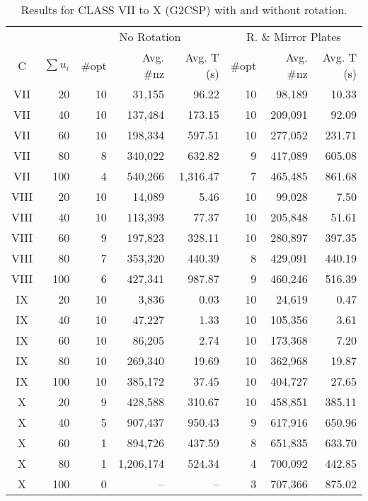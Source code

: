 \begin{table}[!t]
\centering
\caption{Results for CLASS VII to X (G2CSP) with and without rotation.}
\label{tab:g2csp_class_7to10_joined}
\begin{tabular}{crrrrrrr}
\hline\hline
& & \multicolumn{3}{c}{No Rotation} & \multicolumn{3}{c}{R. \& Mirror Plates} \\\cmidrule(lr){3-5}\cmidrule(lr){6-8}
C & \(\sum u_i\) & \#opt & Avg. \#nz & Avg. T (s) & \#opt & Avg. \#nz & Avg. T (s) \\\hline
 VII &  20 & 10 & 31,155 & 96.22 & 10 & 98,189 & 10.33 \\
 VII &  40 & 10 & 137,484 & 173.15 & 10 & 209,091 & 92.09 \\
 VII &  60 & 10 & 198,334 & 597.51 & 10 & 277,052 & 231.71 \\
 VII &  80 & 8 & 340,022 & 632.82 & 9 & 417,089 & 605.08 \\
 VII & 100 & 4 & 540,266 & 1,316.47 & 7 & 465,485 & 861.68 \\
VIII &  20 & 10 & 14,089 & 5.46 & 10 & 99,028 & 7.50 \\
VIII &  40 & 10 & 113,393 & 77.37 & 10 & 205,848 & 51.61 \\
VIII &  60 & 9 & 197,823 & 328.11 & 10 & 280,897 & 397.35 \\
VIII &  80 & 7 & 353,320 & 440.39 & 8 & 429,091 & 440.19 \\
VIII & 100 & 6 & 427,341 & 987.87 & 9 & 460,246 & 516.39 \\
  IX &  20 & 10 & 3,836 & 0.03 & 10 & 24,619 & 0.47 \\
  IX &  40 & 10 & 47,227 & 1.33 & 10 & 105,356 & 3.61 \\
  IX &  60 & 10 & 86,205 & 2.74 & 10 & 173,368 & 7.20 \\
  IX &  80 & 10 & 269,340 & 19.69 & 10 & 362,968 & 19.87 \\
  IX & 100 & 10 & 385,172 & 37.45 & 10 & 404,727 & 27.65 \\
   X &  20 & 9 & 428,588 & 310.67 & 10 & 458,851 & 385.11 \\
   X &  40 & 5 & 907,437 & 950.43 & 9 & 617,916 & 650.96 \\
   X &  60 & 1 & 894,726 & 437.59 & 8 & 651,835 & 633.70 \\
   X &  80 & 1 & 1,206,174 & 524.34 & 4 & 700,092 & 442.85 \\
   X & 100 & 0 & -- & -- & 3 & 707,366 & 875.02 \\\hline\hline
\end{tabular}%
\end{table}

